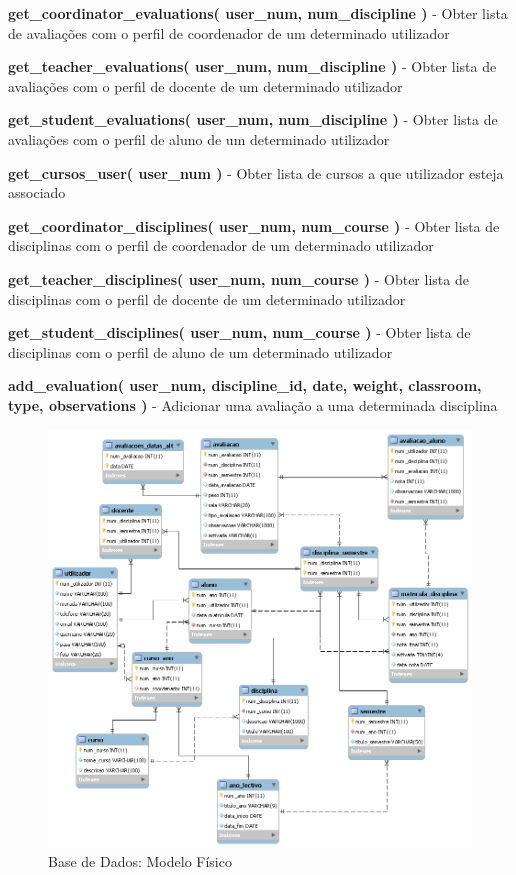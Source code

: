 \begin{list}{\textbf{-}}{\textbf{STORED PROCEDURES}}
\item \textbf{get\_coordinator\_evaluations( user\_num, num\_discipline )} - Obter lista de avaliações com o perfil de coordenador de um determinado utilizador
\item \textbf{get\_teacher\_evaluations( user\_num, num\_discipline )} - Obter lista de avaliações com o perfil de docente de um determinado utilizador
\item \textbf{get\_student\_evaluations( user\_num, num\_discipline )} - Obter lista de avaliações com o perfil de aluno de um determinado utilizador
\item \textbf{get\_cursos\_user( user\_num )} - Obter lista de cursos a que utilizador esteja associado
\item \textbf{get\_coordinator\_disciplines( user\_num, num\_course )} - Obter lista de disciplinas com o perfil de coordenador de um determinado utilizador
\item \textbf{get\_teacher\_disciplines( user\_num, num\_course )} - Obter lista de disciplinas com o perfil de docente de um determinado utilizador
\item \textbf{get\_student\_disciplines( user\_num, num\_course )} - Obter lista de disciplinas com o perfil de aluno de um determinado utilizador
\item \textbf{add\_evaluation( user\_num, discipline\_id, date, weight, classroom, type, observations )} - Adicionar uma avaliação a uma determinada disciplina
\end{list}

\begin{figure}[!htbp]
\centering
\includegraphics{imagens/base_de_dados.png}
\caption{Base de Dados: Modelo Físico}
\label{fig:modelo_fisico}
\end{figure}

